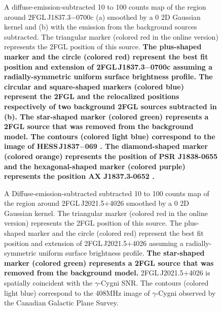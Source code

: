 \documentclass[12pt,preprint]{aastex}
\newif\ifcolorfigure
\newcommand{\gev}{\text{GeV}\xspace}
\newcommand{\tev}{\text{TeV}\xspace}
\newcommand{\newtext}[1]{{\bfseries \color{red}#1}}
\begin{document}
\begin{figure}
    \ifcolorfigure
      \plotone{source_plots/source_HESS_J1837-069_color.eps}
    \else
    \fi
  \caption{
  A diffuse-emission-subtracted 10 \gev to 100 \gev counts map of the
  region around 2FGL\,J1837.3$-$0700c (a) smoothed by a 0 2D Gaussian
  kernel and (b) with the emission from the background sources subtracted.
  The triangular marker (colored red in the online version) represents
  the 2FGL
  position of this source. 
  \newtext{
  The plus-shaped marker and 
  the circle (colored red) represent the best fit position and extension
  of 2FGL\,J1837.3$-$0700c assuming a radially-symmetric uniform surface
  brightness profile. The circular and square-shaped markers (colored
  blue) represent the 2FGL and the relocalized positions respectively of
  two background 2FGL sources subtracted in (b).  The star-shaped marker
  (colored green) represents a 2FGL source that was removed from the
  background model.  The contours (colored light blue) correspond to
  the \tev image of HESS\,J1837$-$069
  \citep{hess_plane_survey}.
  The diamond-shaped marker (colored orange) represents the position of PSR J1838-0655
  and the hexagonal-shaped marker (colored purple) represents the position AX J1837.3-0652
  \citep{pulsations_HESS_J1837-069}.
  }
  }\label{1FGL_J1837.5-0659c}
\end{figure}


\begin{figure}
    \ifcolorfigure
      \plotone{source_plots/source_Gamma_Cygni_color.eps}
    \else
    \fi
  \caption{A Diffuse-emission-subtracted 
  subtracted 10 \gev to 100 \gev counts map of the
  region around 2FGL\,J2021.5+4026 smoothed by a 0 2D Gaussian
  kernel. The triangular marker (colored red in the online version)
  represents the 2FGL position of this source.  The plus-shaped
  marker and the circle (colored red) represent the best fit position
  and extension of 2FGL\,J2021.5+4026 assuming a radially-symmetric
  uniform surface brightness profile.  \newtext{
  The star-shaped marker (colored green)
  represents a 2FGL source that was removed from the background model.
  }
  2FGL\,J2021.5+4026
  is spatially coincident with the $\gamma$-Cygni SNR.  The contours
  (colored light blue) correspond to the 408MHz image of $\gamma$-Cygni
  observed by the Canadian Galactic Plane Survey.
  }\label{1FGL_J2020.0+4049}
\end{figure}
\end{document}

